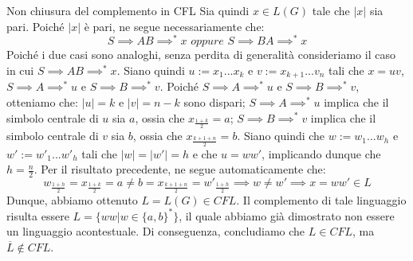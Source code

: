 \begin{Example}{Non chiusura del complemento in CFL}{}
Sia quindi $x \in L(G)$ tale che $|x|$ sia pari.
Poiché $|x|$ è pari, ne segue necessariamente che:
\begin{equation*}
S \implies AB \implies^* x \textit{ oppure } S \implies BA \implies^* x    
\end{equation*}
Poiché i due casi sono analoghi, senza perdita di generalità consideriamo il caso in
cui $S \implies AB \implies^* x$.
Siano quindi $u := x_1 . . . x_k$ e $v := x_{k+1} . . . v_n$ tali che $x = uv$, $S \implies A
\implies^* u$ e $S \implies B\implies^* v$.
Poiché $S \implies A \implies^* u$ e $S \implies B \implies^* v$, otteniamo che: $|u| = k$ e $|v| = n - k$ sono dispari; $S \implies A \implies^* u$ implica che il simbolo centrale di $u$ sia $a$, ossia che $x_{\frac{1+k}{2}}= a$; $S \implies B\implies^* v$ implica che il simbolo centrale di $v$ sia $b$, ossia che $x_{\frac{k+1+n}{2}}= b$.
Siano quindi che $w := w_1 . . . w_h$ e $w':= w'_1. . . w'_h$ tali che $|w| = |w'| = h$ e che $u = ww'$, implicando dunque che $h = \frac{n}{2}$. Per il risultato precedente, ne segue automaticamente che:
\begin{equation*}
    w_{\frac{1+h}{2}}=x_{\frac{1+k}{2}}= a\neq b=x_{\frac{k+1+n}{2}}=w'_{\frac{1+h}{2}}\implies w\neq w' \implies x = ww' \in L
\end{equation*}
Dunque, abbiamo ottenuto $L = L(G) \in CFL$. Il complemento di tale linguaggio risulta essere $L = \{ww | w \in \{a, b\}^*\}$, il quale abbiamo già dimostrato non essere un linguaggio acontestuale. Di conseguenza, concludiamo che $L \in CFL$, ma $\overline{L} \notin CFL$.
\end{Example}